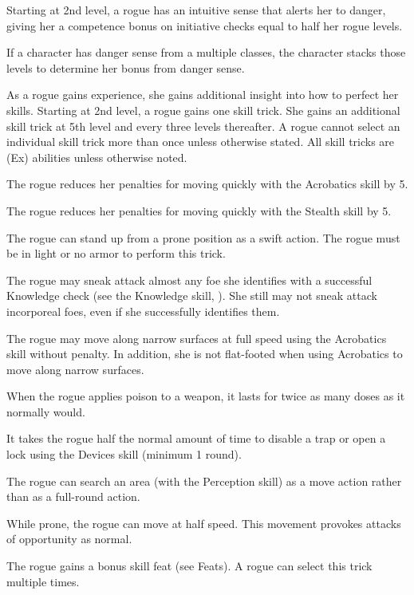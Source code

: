  Starting at 2nd level, a rogue has an intuitive sense that alerts her to danger, giving her a competence bonus on initiative checks equal to half her rogue levels.
\par If a character has danger sense from a multiple classes, the character stacks those levels to determine her bonus from danger sense.

 As a rogue gains experience, she gains additional insight into how to perfect her skills. Starting at 2nd level, a rogue gains one skill trick. She gains an additional skill trick at 5th level and every three levels thereafter. A rogue cannot select an individual skill trick more than once unless otherwise stated. All skill tricks are (Ex) abilities unless otherwise noted.

 The rogue reduces her penalties for moving quickly with the Acrobatics skill by 5.

 The rogue reduces her penalties for moving quickly with the Stealth skill by 5.

 The rogue can stand up from a prone position as a swift action. The rogue must be in light or no armor to perform this trick.

 The rogue may sneak attack almost any foe she identifies with a successful Knowledge check (see the Knowledge skill, ). She still may not sneak attack incorporeal foes, even if she successfully identifies them.

 The rogue may move along narrow surfaces at full speed using the Acrobatics skill without penalty. In addition, she is not flat-footed when using Acrobatics to move along narrow surfaces.

 When the rogue applies poison to a weapon, it lasts for twice as many doses as it normally would.

 It takes the rogue half the normal amount of time to disable a trap or open a lock using the Devices skill (minimum 1 round).

 The rogue can search an area (with the Perception skill) as a move action rather than as a full-round action.

 While prone, the rogue can move at half speed. This movement provokes attacks of opportunity as normal.

 The rogue gains a bonus skill feat (see Feats). A rogue can select this trick multiple times.

